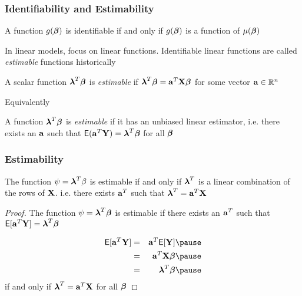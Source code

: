 \documentclass{beamer}\usepackage[]{graphicx}\usepackage[]{color}
\begin{document}
\begin{frame}
  \frametitle{Identifiability and Estimability}
  \begin{theorem}
    A function $g(\boldsymbol{\beta})$ is identifiable if and only if $g(\boldsymbol{\beta})$ is a
    function of $\mu(\boldsymbol{\beta})$
  \end{theorem} \pause
In linear models, focus on linear functions.  Identifiable linear
functions are called {\it estimable} functions historically \pause

\begin{definition}
  A scalar function $\boldsymbol{\lambda}^T \boldsymbol{\beta}$ is {\it estimable} if $\boldsymbol{\lambda}^T \boldsymbol{\beta}
  = \mathbf{a}^T \mathbf{X} \boldsymbol{\beta}$ for some vector $\mathbf{a} \in \mathbb{R}^n$ \pause
\end{definition}
Equivalently

\begin{definition}
  A  function $\boldsymbol{\lambda}^T \boldsymbol{\beta}$ is {\it estimable} if it has
  an unbiased linear estimator,   i.e. there exists an $\mathbf{a}$ such that
  $\textsf{E}(\mathbf{a}^T \mathbf{Y}) = \boldsymbol{\lambda}^T \boldsymbol{\beta}$ for all $\boldsymbol{\beta}$
\end{definition}

\end{frame}
\begin{frame}
  \frametitle{Estimability}
  \begin{theorem}
    The function $\psi = \boldsymbol{\lambda}^T \beta$ is estimable if and only if
    $\boldsymbol{\lambda}^T$ is a linear combination of the rows of
    $\mathbf{X}$. i.e. there exists $\mathbf{a}^T$ such that  $\boldsymbol{\lambda}^T = \mathbf{a}^T \mathbf{X}$
  \end{theorem} \pause
  \begin{proof}
   The function $\psi= \boldsymbol{\lambda}^T\boldsymbol{\beta}$ is estimable if there exists an $\mathbf{a}^T$ such that
    $\textsf{E}[\mathbf{a}^T\mathbf{Y}] = \boldsymbol{\lambda}^T\boldsymbol{\beta}$ \pause

    \begin{eqnarray*}
      \E[\a^T\Y] & =  &\a^T \E[\Y] \pause\\
                 & = & \a^T \X \b \pause \\
  & =& \lambdab^T \b  \pause
    \end{eqnarray*}
if and only if $\boldsymbol{\lambda}^T = \mathbf{a}^T \mathbf{X}$ for all $\boldsymbol{\beta}$
  \end{proof}
\end{frame}
\end{document}
